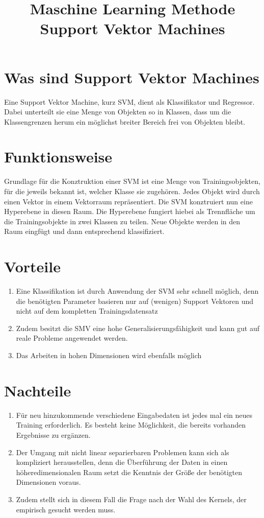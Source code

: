 \documentclass[a4paper,12pt]{article}
\title{Maschine Learning Methode Support Vektor Machines}
\begin{document}
\section{Was sind Support Vektor Machines}
Eine Support Vektor Machine, kurz SVM, dient als Klassifikator und Regressor. Dabei unterteilt sie eine Menge von Objekten so in Klassen, dass um die Klassengrenzen herum ein möglichst breiter Bereich frei von Objekten bleibt. 
\section{Funktionsweise}
Grundlage für die Konztruktion einer SVM ist eine Menge von Trainingsobjekten, für die jeweils bekannt ist, welcher Klasse sie zugehören. Jedes Objekt wird durch einen Vektor in einem Vektorraum repräsentiert. Die SVM konztruiert nun eine Hyperebene in diesen Raum. Die Hyperebene fungiert hiebei als Trennfläche um die Trainingsobjekte in zwei Klassen zu teilen. Neue Objekte werden in den Raum eingfügt und dann entsprechend klassifiziert.
\section{Vorteile}
\begin{center}
\begin{enumerate}
\item Eine Klassifikation ist durch Anwendung der SVM sehr schnell möglich, denn die benötigten Parameter basieren nur auf (wenigen) Support Vektoren und nicht auf dem kompletten Trainingsdatensatz
\item Zudem besitzt die SMV eine hohe Generalisierungsfähigkeit und kann gut auf reale Probleme angewendet werden.
\item Das Arbeiten in hohen Dimensionen wird ebenfalls möglich
\end{enumerate}
\end{center}
\section{Nachteile}
\begin{enumerate}
\item Für neu hinzukommende verschiedene Eingabedaten ist jedes mal ein neues Training erforderlich. Es besteht keine Möglichkeit, die bereits vorhanden Ergebnisse zu ergänzen.\item Der Umgang mit nicht linear separierbaren Problemen kann sich als kompliziert herausstellen, denn die Überführung der Daten in einen höheredimensionalen Raum setzt die Kenntnis der Größe der benötigten Dimensionen voraus.
\item Zudem stellt sich in diesem Fall die Frage nach der Wahl des Kernels, der empirisch gesucht werden muss.
\end{enumerate}
\end{document}
